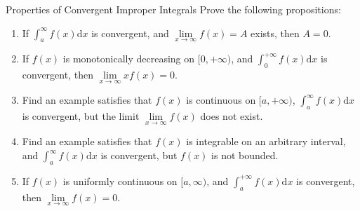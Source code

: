 \begin{example}{Properties of Convergent Improper Integrals}{}
  Prove the following propositions:
  \begin{enumerate}
  \item If $\int_a^{\infty}f(x)\mathrm{d} x$ is convergent,
    and $\lim \limits _{x \rightarrow \infty}f(x) = A$ exists,
    then $A = 0$.
  \item If $f(x)$ is monotonically decreasing on $[0, +\infty)$,
    and $\int_0^{+\infty}f(x)\mathrm{d} x$ is convergent,
    then $\lim \limits _{x \rightarrow \infty} xf(x) = 0$.
  \item Find an example satisfies that $f(x)$ is continuous on $[a, +\infty)$,
    $\int_a^{\infty}f(x)\mathrm{d} x$ is convergent,
    but the limit $\lim \limits _{x \rightarrow \infty}f(x)$ does not exist.
  \item Find an example satisfies that $f(x)$ is integrable on an arbitrary interval,
    and $\int_a^{\infty}f(x)\mathrm{d} x$ is convergent, but $f(x)$ is not bounded.
  \item If $f(x)$ is uniformly continuous on $[a, \infty)$,
    and $\int_a^{+\infty}f(x)\mathrm{d} x$ is convergent,
    then $\lim \limits _{x \rightarrow \infty}f(x) = 0$.
  \end{enumerate}
\end{example}

